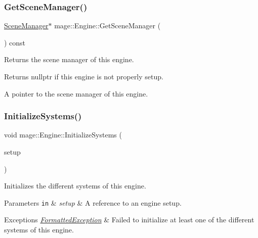 \subsubsection{\texorpdfstring{Get\+Scene\+Manager()}{GetSceneManager()}}
{\footnotesize\ttfamily \hyperlink{classmage_1_1_scene_manager}{Scene\+Manager}$\ast$ mage\+::\+Engine\+::\+Get\+Scene\+Manager (\begin{DoxyParamCaption}{ }\end{DoxyParamCaption}) const\hspace{0.3cm}{\ttfamily [noexcept]}}

Returns the scene manager of this engine.

\begin{DoxyReturn}{Returns}
{\ttfamily nullptr} if this engine is not properly setup. 

A pointer to the scene manager of this engine. 
\end{DoxyReturn}
\hypertarget{classmage_1_1_engine_a29a47448fb182b110d46d287a72b8b4e}{}\label{classmage_1_1_engine_a29a47448fb182b110d46d287a72b8b4e} 
\subsubsection{\texorpdfstring{Initialize\+Systems()}{InitializeSystems()}}
{\footnotesize\ttfamily void mage\+::\+Engine\+::\+Initialize\+Systems (\begin{DoxyParamCaption}\item[{const \hyperlink{structmage_1_1_engine_setup}{Engine\+Setup} \&}]{setup }\end{DoxyParamCaption})\hspace{0.3cm}{\ttfamily [private]}}

Initializes the different systems of this engine.


\begin{DoxyParams}[1]{Parameters}
\mbox{\tt in}  & {\em setup} & A reference to an engine setup. \\
\hline
\end{DoxyParams}

\begin{DoxyExceptions}{Exceptions}
{\em \hyperlink{structmage_1_1_formatted_exception}{Formatted\+Exception}} & Failed to initialize at least one of the different systems of this engine. \\
\hline
\end{DoxyExceptions}
\hypertarget{classmage_1_1_engine_afd52a8088d6d37605cb352028098c508}{}\label{classmage_1_1_engine_afd52a8088d6d37605cb352028098c508} 
